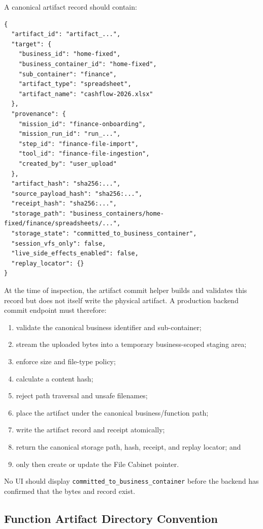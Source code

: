 A canonical artifact record should contain:

\begin{verbatim}
{
  "artifact_id": "artifact_...",
  "target": {
    "business_id": "home-fixed",
    "business_container_id": "home-fixed",
    "sub_container": "finance",
    "artifact_type": "spreadsheet",
    "artifact_name": "cashflow-2026.xlsx"
  },
  "provenance": {
    "mission_id": "finance-onboarding",
    "mission_run_id": "run_...",
    "step_id": "finance-file-import",
    "tool_id": "finance-file-ingestion",
    "created_by": "user_upload"
  },
  "artifact_hash": "sha256:...",
  "source_payload_hash": "sha256:...",
  "receipt_hash": "sha256:...",
  "storage_path": "business_containers/home-fixed/finance/spreadsheets/...",
  "storage_state": "committed_to_business_container",
  "session_vfs_only": false,
  "live_side_effects_enabled": false,
  "replay_locator": {}
}
\end{verbatim}

At the time of inspection, the artifact commit helper builds and validates this
record but does not itself write the physical artifact. A production backend
commit endpoint must therefore:

\begin{enumerate}
  \item validate the canonical business identifier and sub-container;
  \item stream the uploaded bytes into a temporary business-scoped staging area;
  \item enforce size and file-type policy;
  \item calculate a content hash;
  \item reject path traversal and unsafe filenames;
  \item place the artifact under the canonical business/function path;
  \item write the artifact record and receipt atomically;
  \item return the canonical storage path, hash, receipt, and replay locator; and
  \item only then create or update the File Cabinet pointer.
\end{enumerate}

No UI should display \texttt{committed\_to\_business\_container} before the
backend has confirmed that the bytes and record exist.

\subsection{Function Artifact Directory Convention}


